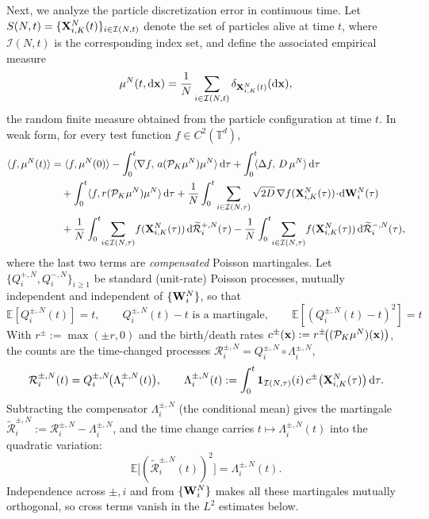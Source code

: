 \documentclass[a4paper,fleqn]{cas-sc}
\theoremstyle{definition}
\theoremstyle{remark}
\begin{document}
Next, we analyze the particle discretization error in continuous time.
Let $S(N,t)=\{\mathbf{X}^N_{i,K}(t)\}_{i\in\mathcal I(N,t)}$ denote the set of particles
alive at time $t$, where $\mathcal I(N,t)$ is the corresponding index set, and
define the associated empirical measure
\[
  \mu^N(t,\mathrm{d}\mathbf{x})
  = \frac{1}{N}\sum_{i\in\mathcal I(N,t)}\delta_{\mathbf{X}^N_{i,K}(t)}(\mathrm{d}\mathbf{x}),
\]
the random finite measure obtained from the particle configuration at time $t$.
In weak form, for every test function $f\in C^2(\mathbb T^d)$,
 \begin{equation}\label{eq:weak-form}
     \begin{aligned}
\langle f, \mu^N(t)\rangle
&= \langle f, \mu^N(0)\rangle
 - \int_0^t
   \!\!\langle\nabla f,\,a(\mathcal P_K\mu^N)\mu^N\rangle\,\intd\tau
 + \int_0^t
   \!\!\langle\Delta f,\,D\,\mu^N\rangle\,\intd\tau \\
&\quad + \int_0^t \langle f, r(\mathcal P_K \mu^N)\mu^N\rangle\,\intd\tau 
 + \frac{1}{N}\int_0^t\sum_{i\in\mathcal I(N,\tau)}
   \sqrt{2D}\,\nabla f(\bX_{i,K}^N(\tau))\!\cdot\! \intd \bW^N_i(\tau)\\
 &\quad + \frac{1}{N}\int_0^t\!\sum_{i\in\mathcal I(N,\tau)}\!
   f(\bX_{i,K}^N(\tau))\, \intd \widetilde{\mathcal R}^{+,N}_i(\tau)
 - \frac{1}{N}\int_0^t\!\sum_{i\in\mathcal I(N,\tau)}\!
   f(\bX_{i,K}^N(\tau))\, \intd \widetilde{\mathcal R}^{-,N}_i(\tau),
\end{aligned}
 \end{equation}
where the last two terms are \emph{compensated} Poisson martingales. Let
$\{Q^{+,N}_i,Q^{-,N}_i\}_{i\ge1}$ be standard (unit-rate) Poisson processes,
mutually independent and independent of $\{\mathbf{W}^N_i\}$, so that
\[
\mathbb E[Q^{\pm,N}_i(t)]=t,\qquad
Q^{\pm,N}_i(t)-t \text{ is a martingale},\qquad
\mathbb E[(Q^{\pm,N}_i(t)-t)^2]=t
\]
With $r^\pm:=\max(\pm r,0)$ and the birth/death rates
$c^\pm(\mathbf{x}):=r^\pm\!\bigl((\mathcal P_K\mu^N)(\mathbf{x})\bigr)$, the counts are the
time-changed processes $\mathcal R^{\pm,N}_i=Q^{\pm,N}_i\!\circ\Lambda^{\pm,N}_i$,
\[
\mathcal R^{\pm,N}_i(t)=Q^{\pm,N}_i\!\bigl(\Lambda^{\pm,N}_i(t)\bigr),
\qquad
\Lambda^{\pm,N}_i(t):=\int_0^t \mathbf 1_{\mathcal I(N,\tau)}(i)\,
   c^\pm\bigl(\mathbf{X}^N_{i,K}(\tau)\bigr)\,\mathrm{d}\tau .
\]
Subtracting the compensator $\Lambda^{\pm,N}_i$ (the conditional mean) gives the
martingale $\widetilde{\mathcal R}^{\pm,N}_i:=\mathcal R^{\pm,N}_i-\Lambda^{\pm,N}_i$,
and the time change carries $t\mapsto\Lambda^{\pm,N}_i(t)$ into the quadratic
variation:
\begin{equation}\label{eq:R-qv}
\mathbb E\bigl[(\widetilde{\mathcal R}^{\pm,N}_i(t))^2\bigr]
=\Lambda^{\pm,N}_i(t).
\end{equation}
Independence across $\pm,i$ and from $\{\mathbf{W}^N_i\}$ makes all these martingales
mutually orthogonal, so cross terms vanish in the $L^2$ estimates below.
\end{document}
